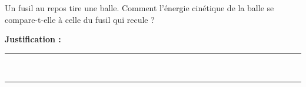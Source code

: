 Un fusil au repos tire une balle. Comment l'énergie cinétique de la balle se compare-t-elle à celle du fusil qui recule ?

\choices

\noindent\textbf{Justification :} \hrulefill \\[2.5ex]
\rule{\linewidth}{0.4pt} \\[2.5ex]
\rule{\linewidth}{0.4pt}
\vfill
